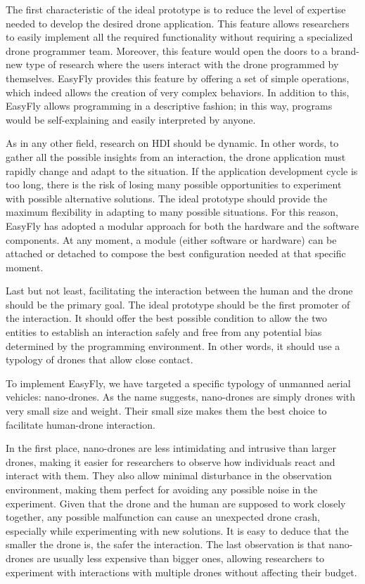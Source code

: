The first characteristic of the ideal prototype is to reduce the level of expertise needed to develop the desired drone application. 
This feature allows researchers to easily implement all the required functionality without requiring a specialized drone programmer team. 
Moreover, this feature would open the doors to a brand-new type of research where the users interact with the drone programmed by themselves.
EasyFly provides this feature by offering a set of simple operations, which indeed allows the creation of very complex behaviors.
In addition to this, EasyFly allows programming in a descriptive fashion; in this way, programs would be self-explaining and easily interpreted by anyone.

As in any other field, research on HDI should be dynamic. 
In other words, to gather all the possible insights from an interaction, the drone application must rapidly change and adapt to the situation.
If the application development cycle is too long, there is the risk of losing many possible opportunities to experiment with possible alternative solutions. 
The ideal prototype should provide the maximum flexibility in adapting to many possible situations.
For this reason, EasyFly has adopted a modular approach for both the hardware and the software components.
At any moment, a module (either software or hardware) can be attached or detached to compose the best configuration needed at that specific moment.

Last but not least, facilitating the interaction between the human and the drone should be the primary goal.
The ideal prototype should be the first promoter of the interaction. 
It should offer the best possible condition to allow the two entities to establish an interaction safely and free from any potential bias determined by the programming environment.
In other words, it should use a typology of drones that allow close contact.

To implement EasyFly, we have targeted a specific typology of unmanned aerial vehicles: nano-drones.
As the name suggests, nano-drones are simply drones with very small size and weight. Their small size makes them the best choice to facilitate human-drone interaction.

In the first place, nano-drones are less intimidating and intrusive than larger drones, making it easier for
researchers to observe how individuals react and interact with them. They also allow minimal disturbance in the
observation environment, making them perfect for avoiding any possible noise in the experiment.
Given that the drone and the human are supposed to work closely together, any possible malfunction can cause an unexpected drone crash, 
especially while experimenting with new solutions. It is easy to deduce that the smaller the drone is, the safer the interaction.
The last observation is that nano-drones are usually less expensive than bigger ones, allowing researchers
to experiment with interactions with multiple drones without affecting their budget.


